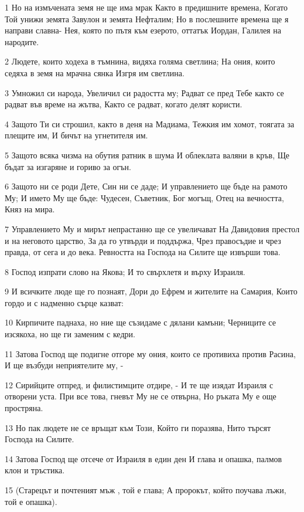 \par 1 Но на измъчената земя не ще има мрак Както в предишните времена, Когато Той унижи земята Завулон и земята Нефталим; Но в послешните времена ще я направи славна- Нея, която по пътя към езерото, оттатък Иордан, Галилея на народите.
\par 2 Людете, които ходеха в тъмнина, видяха голяма светлина; На ония, които седяха в земя на мрачна сянка Изгря им светлина.
\par 3 Умножил си народа, Увеличил си радостта му; Радват се пред Тебе както се радват във време на жътва, Както се радват, когато делят користи.
\par 4 Защото Ти си строшил, както в деня на Мадиама, Тежкия им хомот, тоягата за плещите им, И бичът на угнетителя им.
\par 5 Защото всяка чизма на обутия ратник в шума И облеклата валяни в кръв, Ще бъдат за изгаряне и гориво за огън.
\par 6 Защото ни се роди Дете, Син ни се даде; И управлението ще бъде на рамото Му; И името Му ще бъде: Чудесен, Съветник, Бог могъщ, Отец на вечността, Княз на мира.
\par 7 Управлението Му и мирът непрастанно ще се увеличават На Давидовия престол и на неговото царство, За да го утвърди и поддържа, Чрез правосъдие и чрез правда, от сега и до века. Ревността на Господа на Силите ще извърши това.
\par 8 Господ изпрати слово на Якова; И то свърхлетя и върху Израиля.
\par 9 И всичките люде ще го познаят, Дори до Ефрем и жителите на Самария, Които гордо и с надменно сърце казват:
\par 10 Кирпичите паднаха, но ние ще съзидаме с дялани камъни; Черниците се изсякоха, но ще ги заменим с кедри.
\par 11 Затова Господ ще подигне отгоре му ония, които се противиха против Расина, И ще възбуди неприятелите му, -
\par 12 Сирийците отпред, и филистимците отдире, - И те ще изядат Израиля с отворени уста. При все това, гневът Му не се отвърна, Но ръката Му е още простряна.
\par 13 Но пак людете не се връщат към Този, Който ги поразява, Нито търсят Господа на Силите.
\par 14 Затова Господ ще отсече от Израиля в един ден И глава и опашка, палмов клон и тръстика.
\par 15 (Старецът и почтеният мъж , той е глава; А пророкът, който поучава лъжи, той е опашка).
